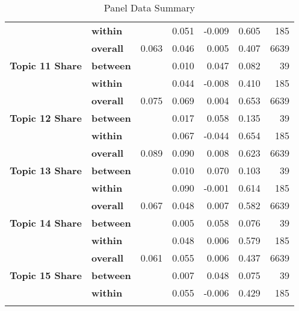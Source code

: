\begin{longtable}{lllrrrr}
               & \textbf{within} &       &      0.051 & -0.009 & 0.605 &           185 \\
\cline{1-7}
\multirow{3}{*}{\textbf{Topic 11 Share}} & \textbf{overall} & 0.063 &      0.046 &  0.005 & 0.407 &          6639 \\
               & \textbf{between} &       &      0.010 &  0.047 & 0.082 &            39 \\
               & \textbf{within} &       &      0.044 & -0.008 & 0.410 &           185 \\
\cline{1-7}
\multirow{3}{*}{\textbf{Topic 12 Share}} & \textbf{overall} & 0.075 &      0.069 &  0.004 & 0.653 &          6639 \\
               & \textbf{between} &       &      0.017 &  0.058 & 0.135 &            39 \\
               & \textbf{within} &       &      0.067 & -0.044 & 0.654 &           185 \\
\cline{1-7}
\multirow{3}{*}{\textbf{Topic 13 Share}} & \textbf{overall} & 0.089 &      0.090 &  0.008 & 0.623 &          6639 \\
               & \textbf{between} &       &      0.010 &  0.070 & 0.103 &            39 \\
               & \textbf{within} &       &      0.090 & -0.001 & 0.614 &           185 \\
\cline{1-7}
\multirow{3}{*}{\textbf{Topic 14 Share}} & \textbf{overall} & 0.067 &      0.048 &  0.007 & 0.582 &          6639 \\
               & \textbf{between} &       &      0.005 &  0.058 & 0.076 &            39 \\
               & \textbf{within} &       &      0.048 &  0.006 & 0.579 &           185 \\
\cline{1-7}
\multirow{3}{*}{\textbf{Topic 15 Share}} & \textbf{overall} & 0.061 &      0.055 &  0.006 & 0.437 &          6639 \\
               & \textbf{between} &       &      0.007 &  0.048 & 0.075 &            39 \\
               & \textbf{within} &       &      0.055 & -0.006 & 0.429 &           185 \\
\bottomrule
\caption{Panel Data Summary}
\label{tab:xtsum}
\end{longtable}